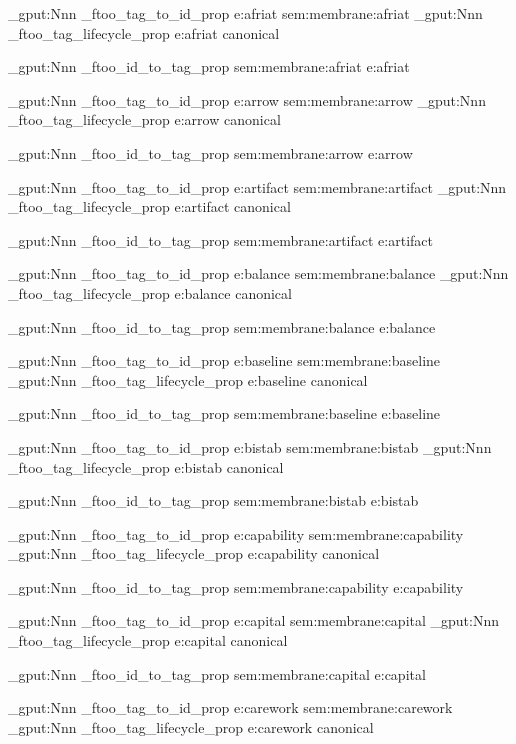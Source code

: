 \prop_gput:Nnn \g_ftoo_tag_to_id_prop { e:afriat } { sem:membrane:afriat }
\prop_gput:Nnn \g_ftoo_tag_lifecycle_prop { e:afriat } { canonical }

\prop_gput:Nnn \g_ftoo_id_to_tag_prop { sem:membrane:afriat } { e:afriat }


\prop_gput:Nnn \g_ftoo_tag_to_id_prop { e:arrow } { sem:membrane:arrow }
\prop_gput:Nnn \g_ftoo_tag_lifecycle_prop { e:arrow } { canonical }

\prop_gput:Nnn \g_ftoo_id_to_tag_prop { sem:membrane:arrow } { e:arrow }


\prop_gput:Nnn \g_ftoo_tag_to_id_prop { e:artifact } { sem:membrane:artifact }
\prop_gput:Nnn \g_ftoo_tag_lifecycle_prop { e:artifact } { canonical }

\prop_gput:Nnn \g_ftoo_id_to_tag_prop { sem:membrane:artifact } { e:artifact }


\prop_gput:Nnn \g_ftoo_tag_to_id_prop { e:balance } { sem:membrane:balance }
\prop_gput:Nnn \g_ftoo_tag_lifecycle_prop { e:balance } { canonical }

\prop_gput:Nnn \g_ftoo_id_to_tag_prop { sem:membrane:balance } { e:balance }


\prop_gput:Nnn \g_ftoo_tag_to_id_prop { e:baseline } { sem:membrane:baseline }
\prop_gput:Nnn \g_ftoo_tag_lifecycle_prop { e:baseline } { canonical }

\prop_gput:Nnn \g_ftoo_id_to_tag_prop { sem:membrane:baseline } { e:baseline }


\prop_gput:Nnn \g_ftoo_tag_to_id_prop { e:bistab } { sem:membrane:bistab }
\prop_gput:Nnn \g_ftoo_tag_lifecycle_prop { e:bistab } { canonical }

\prop_gput:Nnn \g_ftoo_id_to_tag_prop { sem:membrane:bistab } { e:bistab }


\prop_gput:Nnn \g_ftoo_tag_to_id_prop { e:capability } { sem:membrane:capability }
\prop_gput:Nnn \g_ftoo_tag_lifecycle_prop { e:capability } { canonical }

\prop_gput:Nnn \g_ftoo_id_to_tag_prop { sem:membrane:capability } { e:capability }


\prop_gput:Nnn \g_ftoo_tag_to_id_prop { e:capital } { sem:membrane:capital }
\prop_gput:Nnn \g_ftoo_tag_lifecycle_prop { e:capital } { canonical }

\prop_gput:Nnn \g_ftoo_id_to_tag_prop { sem:membrane:capital } { e:capital }


\prop_gput:Nnn \g_ftoo_tag_to_id_prop { e:carework } { sem:membrane:carework }
\prop_gput:Nnn \g_ftoo_tag_lifecycle_prop { e:carework } { canonical }

